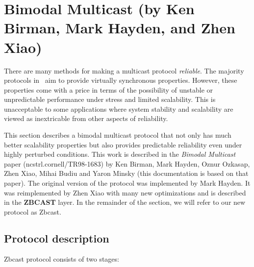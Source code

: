 %
%
%
\section{Bimodal Multicast (by Ken Birman, Mark Hayden, and Zhen
Xiao)}

There are many methods for making a multicast protocol
\emph{reliable}.  The majority protocols in \ensemble\ aim to provide
virtually synchronous properties.  However, these properties come with
a price in terms of the possibility of unstable or unpredictable
performance under stress and limited scalability.  This is
unacceptable to some applications where system stability and
scalability are viewed as inextricable from other aspects of
reliability.

This section describes a bimodal multicast protocol that not only has
much better scalability properties but also provides predictable
reliability even under highly perturbed conditions.  This work is
described in the \emph{Bimodal Multicast} paper
(ncstrl.cornell/TR98-1683) by Ken Birman, Mark Hayden, Oznur Ozkasap,
Zhen Xiao, Mihai Budiu and Yaron Minsky (this documentation is based
on that paper).  The original version of the protocol was implemented
by Mark Hayden.  It was reimplemented by Zhen Xiao with many new
optimizations and is described in the {\bf ZBCAST} layer.  In the
remainder of the section, we will refer to our new protocol as Zbcast.

\subsection{Protocol description}

Zbcast protocol consists of two stages: 


